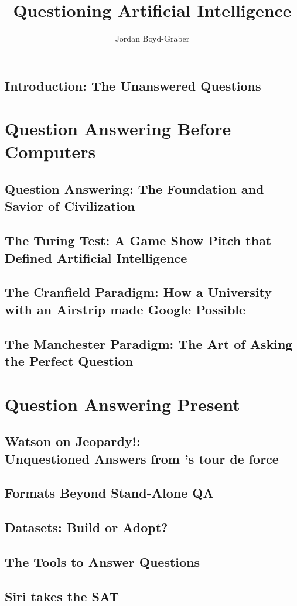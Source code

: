 \documentclass[bfivepaper,twosided,justified,nobib]{style/tufte-book}
\title{Questioning Artificial Intelligence}
\author{Jordan Boyd-Graber}
\newif\ifproposal\proposalfalse
\newcommand{\proposalpart}[1]{
  \ifproposal
  \subsection{#1}
  \else
  \part{#1}
  \fi
}
\newcommand{\chapterfile}[3]{
  \ifproposal
     \invisiblechapter{#3}{ch:#2}
    \label{ch:#2}
  \paragraph{#3}
  
  \else
  \chapter{#3}
  \label{ch:#2}
  \begin{quote}
    
  \end{quote}
  
  \fi}
\begin{document}
\setcounter{secnumdepth}{1}







\clearpage
\ifproposal

\tableofcontents
  \chapter*{Chapter Synopses}

  A brief description of each of the proposed chapters.
  \else
  
\fi


\chapterfile{010}{introduction}{Introduction: The Unanswered Questions}

\proposalpart{Question Answering Before Computers}

\chapterfile{110}{history}{Question Answering: The Foundation and Savior of Civilization}


\chapterfile{120}{turing}{The Turing Test: A Game Show Pitch that
  Defined Artificial Intelligence}

\chapterfile{130}{ir}{The Cranfield Paradigm: How a University with an
  Airstrip made Google Possible}

\chapterfile{140}{manchester}{The Manchester Paradigm: The Art of Asking the
  Perfect Question}


  \proposalpart{Question Answering Present}

  \chapterfile{200}{watson}{Watson on Jeopardy!: \\ Unquestioned Answers from \abr{ibm}'s tour de force}

  \chapterfile{210}{formats}{Formats Beyond Stand-Alone QA}

\chapterfile{220}{datasets}{Datasets: Build or Adopt?}    

\chapterfile{230}{methods}{The Tools to Answer Questions}


\chapterfile{240}{leaderboards}{Siri takes the SAT}






\end{document}
